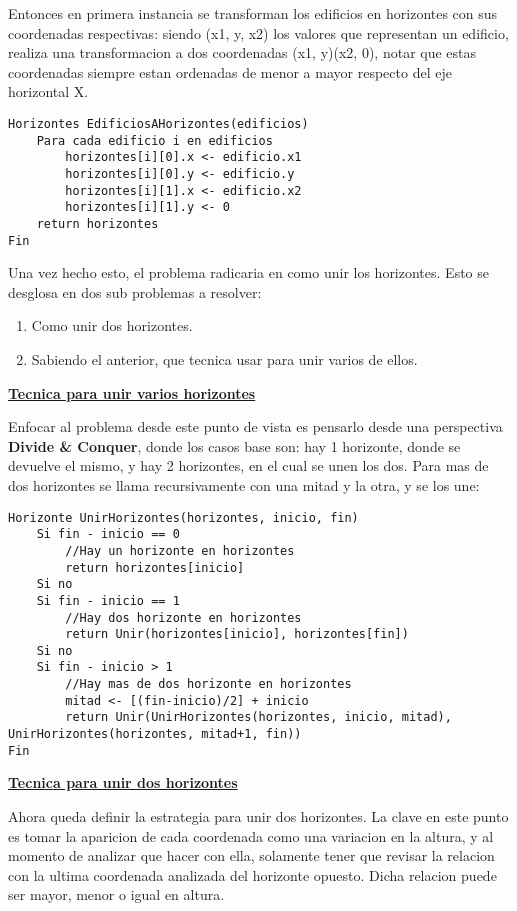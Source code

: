 Entonces en primera instancia se transforman los edificios en horizontes con sus coordenadas respectivas: siendo (x1, y, x2) los valores que representan un edificio, realiza una transformacion a dos coordenadas (x1, y)(x2, 0), notar que estas coordenadas siempre estan ordenadas de menor a mayor respecto del eje horizontal X. 

\begin{lstlisting}
Horizontes EdificiosAHorizontes(edificios)
	Para cada edificio i en edificios
		horizontes[i][0].x <- edificio.x1
		horizontes[i][0].y <- edificio.y
		horizontes[i][1].x <- edificio.x2
		horizontes[i][1].y <- 0
	return horizontes
Fin	
\end{lstlisting}

Una vez hecho esto, el problema radicaria en como unir los horizontes. Esto se desglosa en dos sub problemas a resolver:

\begin{enumerate}
\item Como unir dos horizontes.
\item Sabiendo el anterior, que tecnica usar para unir varios de ellos.
\end{enumerate}
\bigskip
\noindent \underline{\textbf{Tecnica para unir varios horizontes}}

Enfocar al problema desde este punto de vista es pensarlo desde una perspectiva \textbf{Divide \& Conquer}, donde los casos base son: hay 1 horizonte, donde se devuelve el mismo, y hay 2 horizontes, en el cual se unen los dos. Para mas de dos horizontes se llama recursivamente con una mitad y la otra, y se los une:

\begin{lstlisting}
Horizonte UnirHorizontes(horizontes, inicio, fin)
	Si fin - inicio == 0
		//Hay un horizonte en horizontes
		return horizontes[inicio]
	Si no
	Si fin - inicio == 1
		//Hay dos horizonte en horizontes
		return Unir(horizontes[inicio], horizontes[fin])
	Si no
	Si fin - inicio > 1
		//Hay mas de dos horizonte en horizontes
		mitad <- [(fin-inicio)/2] + inicio
		return Unir(UnirHorizontes(horizontes, inicio, mitad), UnirHorizontes(horizontes, mitad+1, fin))
Fin	
\end{lstlisting}

\newpage
\noindent \underline{\textbf{Tecnica para unir dos horizontes}}

Ahora queda definir la estrategia para unir dos horizontes. La clave en este punto es tomar la aparicion de cada coordenada como una variacion en la altura, y al momento de analizar que hacer con ella, solamente tener que revisar la relacion con la ultima coordenada analizada del horizonte opuesto. Dicha relacion puede ser mayor, menor o igual en altura. 

